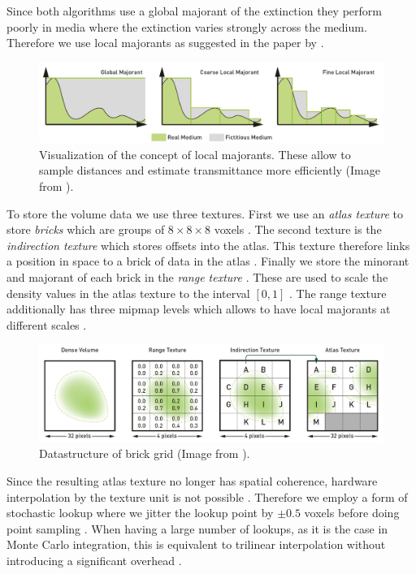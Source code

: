 Since both algorithms use a global majorant of the extinction they perform poorly in media where the extinction varies strongly across the medium.
Therefore we use local majorants as suggested in the paper  by \citeauthor{brick_grid} \cite{brick_grid}.
\begin{figure}[!ht]
    \centering
    \includegraphics[width=0.9\linewidth]{img/brick_grid_majorants.png}
    \caption{Visualization of the concept of local majorants. These allow to sample distances and estimate transmittance more efficiently (Image from \cite[p. 3]{brick_grid}).}
    \label{fig:brick_grid_datastructure}
\end{figure}
To store the volume data we use three textures.
First we use an \textit{atlas texture} to store \textit{bricks} which are groups of $8 \times 8 \times 8$ voxels \cite[p. 4]{brick_grid}.
The second texture is the \textit{indirection texture} which stores offsets into the atlas.
This texture therefore links a position in space to a brick of data in the atlas \cite[p. 4]{brick_grid}.
Finally we store the minorant and majorant of each brick in the \textit{range texture} \cite[p. 4]{brick_grid}.
These are used to scale the density values in the atlas texture to the interval $[0, 1]$ \cite[p. 4]{brick_grid}.
The range texture additionally has three mipmap levels which allows to have local majorants at different scales \cite[p. 7]{brick_grid}.
\begin{figure}[!ht]
    \centering
    \includegraphics[width=0.9\linewidth]{img/brick_grid_datastructure.png}
    \caption{Datastructure of brick grid (Image from \cite[p. 4]{brick_grid}).}
    \label{fig:brick_grid_datastructure}
\end{figure}
Since the resulting atlas texture no longer has spatial coherence, hardware interpolation by the texture unit is not possible \cite[p. 5]{brick_grid}.
Therefore we employ a form of stochastic lookup where we jitter the lookup point by $\pm0.5$ voxels before doing point sampling \cite[p. 5]{brick_grid}.
When having a large number of lookups, as it is the case in Monte Carlo integration, this is equivalent to trilinear interpolation without introducing a significant overhead \cite[p. 5]{brick_grid}.

